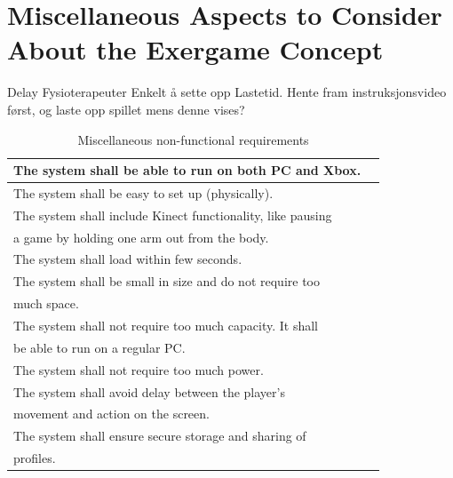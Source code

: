 \section{Miscellaneous Aspects to Consider About the Exergame Concept}
\label{sec:misc}

Delay
Fysioterapeuter
Enkelt å sette opp
Lastetid. Hente fram instruksjonsvideo først, og laste opp spillet mens denne vises?

\begin{table} [H]
\label{tab:nfunc}
\centering
    \begin{tabular}{|l|l|}
 
       \hline
The system shall be able to run on both PC and Xbox. \\ \hline
The system shall be easy to set up (physically).\\ \hline
The system shall include Kinect functionality, like pausing \\ a game by holding one arm out from the body. \\ \hline
The system shall load within few seconds.\\ \hline
The system shall be small in size and do not require too \\ much space.\\ \hline
The system shall not require too much capacity. It shall \\ be able to run on a regular PC. \\ \hline
The system shall not require too much power. \\ \hline
The system shall avoid delay between the player's \\ movement and action on the screen.\\ \hline
The system shall ensure secure storage and sharing of \\ profiles. \\ \hline
    \end{tabular}
    \caption[Miscellaneous non-functional requirements]{Miscellaneous non-functional requirements}
    \label{tab:agenda}
\end{table} 
